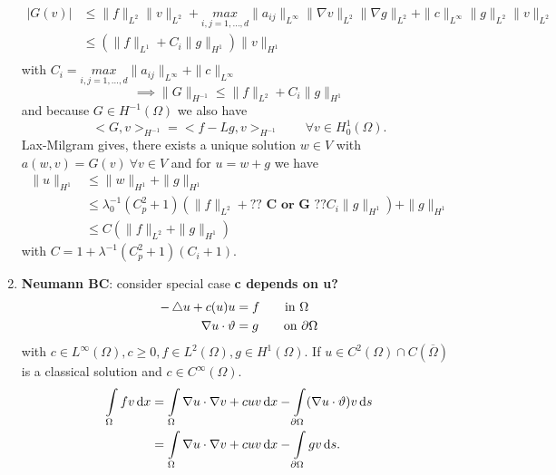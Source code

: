 \begin{enumerate}[=(\alph*)]
\begin{proof_}
\begin{itemize}
			\begin{align*}
				|G(v)| & \leq \|f\|_{L^2}\|v\|_{L^2} + \underset{i,j=1, \dots, d}{max} \|a_{ij}\|_{L^\infty} \|\nabla v\|_{L^2} \|\nabla g\|_{L^2} + \|c\|_{L^\infty}\|g\|_{L^2}\|v\|_{L^2}\\
					   & \leq \left(  \|f\|_{L^1} + C_i\|g\|_{H^1} \right) \|v\|_{H^1}\\ 
			\end{align*}
			with $C_i =  \underset{i,j=1, \dots, d}{max} \|a_{ij}\|_{L^\infty} + \|c\|_{L^\infty}$
			\begin{equation*}
				\implies  \|G\|_{H^{-1}} \leq \|f\|_{L^2} +  C_i\|g\|_{H^1}
			\end{equation*}
			and because $G \in H^{-1}(\Omega)$ we also have
			\begin{equation*}
				<G,v>_{H^{-1}} = <f-Lg,v>_{H^{-1}} \qquad \forall v \in H^1_0(\Omega).
			\end{equation*}
			Lax-Milgram gives, there exists a unique solution $w \in V$ with $a(w,v) = G(v)\ \forall v \in V$ and for $u = w+g$ we have
			\begin{align*}
				\|u\|_{H^1} & \leq \|w\|_{H^1} + \|g\|_{H^1}\\
							& \leq \lambda^{-1}_0 \left( C^2_p +1 \right)\left(  \|f\|_{L^2} + \textbf{?? C or G ??} C_i\|g\|_{H^1} \right) + \|g\|_{H^1}\\
							& \leq C \left( \|f\|_{L^2} + \|g\|_{H^1} \right) 
			\end{align*}
			with $C = 1+ \lambda^{-1}(C^2_p+1)(C_i +1)$.
		\end{itemize}
	\end{proof_}
	\item \textbf{Neumann BC}:\enter
	consider special case  \textbf{c depends on u?} 
	\begin{align*}
		- \mathop{}\!\mathbin\bigtriangleup u + c(u)u &= f \qquad \text{in }\Omega\\
		\nabla u \cdot \vartheta &=g \qquad \text{on } \partial\Omega
	\end{align*}
	with $c \in L^\infty(\Omega), c\geq 0, f\in L^2(\Omega), g \in H^1(\Omega)$.
	If $u \in C^2(\Omega)\cap C(\overline{\Omega})$ is a classical solution and $c \in C^\infty(\Omega)$.
	\begin{align*}
		\int \limits_\Omega fv \diff x &= \int \limits_\Omega \nabla u \cdot  \nabla v + cuv \diff x - \int \limits_{\partial\Omega} (\nabla u \cdot \vartheta)v \diff s\\
		&= \int \limits_\Omega \nabla u \cdot  \nabla v + cuv \diff x - \int \limits_{\partial\Omega} gv \diff s.

\end{align*}
\end{enumerate}
